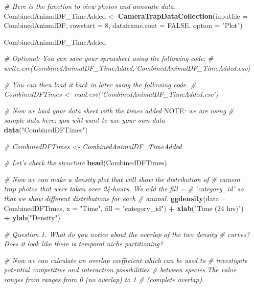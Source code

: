 \documentclass[]{book}
\newenvironment{Shaded}{\begin{snugshade}}{\end{snugshade}}
\newcommand{\AlertTok}[1]{\textcolor[rgb]{0.94,0.16,0.16}{#1}}
\newcommand{\CommentTok}[1]{\textcolor[rgb]{0.56,0.35,0.01}{\textit{#1}}}
\newcommand{\DataTypeTok}[1]{\textcolor[rgb]{0.13,0.29,0.53}{#1}}
\newcommand{\DecValTok}[1]{\textcolor[rgb]{0.00,0.00,0.81}{#1}}
\newcommand{\KeywordTok}[1]{\textcolor[rgb]{0.13,0.29,0.53}{\textbf{#1}}}
\newcommand{\NormalTok}[1]{#1}
\newcommand{\OperatorTok}[1]{\textcolor[rgb]{0.81,0.36,0.00}{\textbf{#1}}}
\newcommand{\OtherTok}[1]{\textcolor[rgb]{0.56,0.35,0.01}{#1}}
\newcommand{\StringTok}[1]{\textcolor[rgb]{0.31,0.60,0.02}{#1}}
\begin{document}
\begin{Shaded}
\begin{Highlighting}[]
\CommentTok{# Here is the function to view photos and annotate data.}
\NormalTok{CombinedAnimalDF_TimeAdded <-}\StringTok{ }\KeywordTok{CameraTrapDataCollection}\NormalTok{(}\DataTypeTok{inputfile =}\NormalTok{ CombinedAnimalDF, }
                                                       \DataTypeTok{rowstart =} \DecValTok{8}\NormalTok{, }\DataTypeTok{dataframe.cont =} \OtherTok{FALSE}\NormalTok{, }\DataTypeTok{option =} \StringTok{"Plot"}\NormalTok{)}

\NormalTok{CombinedAnimalDF_TimeAdded}

\CommentTok{# Optional: You can save your spreasheet using the following code:}
\CommentTok{# write.csv(CombinedAnimalDF_TimeAdded,'CombinedAnimalDF_TimeAdded.csv)}

\CommentTok{# You can then load it back in later using the following code.}
\CommentTok{# CombinedDFTimes <- read.csv('CombinedAnimalDF_TimeAdded.csv')}

\CommentTok{# Now we load your data sheet with the times added }\AlertTok{NOTE}\CommentTok{: we are using}
\CommentTok{# sample data here; you will want to use your own data}
\KeywordTok{data}\NormalTok{(}\StringTok{"CombinedDFTimes"}\NormalTok{)}

\CommentTok{# CombinedDFTimes <- CombinedAnimalDF_TimeAdded}

\CommentTok{# Let's check the structure}
\KeywordTok{head}\NormalTok{(CombinedDFTimes)}

\CommentTok{# Now we can make a density plot that will show the distribution of}
\CommentTok{# camera trap photos that were taken over 24-hours. We add the fill =}
\CommentTok{# 'category_id' so that we show different distributions for each}
\CommentTok{# animal.}
\KeywordTok{ggdensity}\NormalTok{(}\DataTypeTok{data =}\NormalTok{ CombinedDFTimes, }\DataTypeTok{x =} \StringTok{"Time"}\NormalTok{, }\DataTypeTok{fill =} \StringTok{"category_id"}\NormalTok{) }\OperatorTok{+}\StringTok{ }\KeywordTok{xlab}\NormalTok{(}\StringTok{"Time (24 hrs)"}\NormalTok{) }\OperatorTok{+}\StringTok{ }
\StringTok{  }\KeywordTok{ylab}\NormalTok{(}\StringTok{"Density"}\NormalTok{)}

\CommentTok{# Question 1. What do you notice about the overlap of the two density}
\CommentTok{# curves? Does it look like there is temporal niche partitioning?}

\CommentTok{# Now we can calculate an overlap coefficient which can be used to}
\CommentTok{# investigate potential competitive and interaction possibilities}
\CommentTok{# between species.The value ranges from ranges from 0 (no overlap) to 1}
\CommentTok{# (complete overlap).}


\end{Highlighting}
\end{Shaded}
\end{document}
